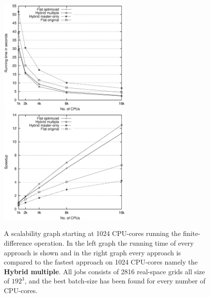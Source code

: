 \documentclass[preprint,3p,times,twocolumn]{elsarticle}
\begin{document}
\begin{figure}
\centerline{
\mbox{\includegraphics[width=250px]{gfx/fidi_scaleruntime}}
\mbox{\includegraphics[width=250px]{gfx/fidi_scale}}
} 
 \caption{A scalability graph starting at 1024 CPU-cores running the finite-difference operation. In the left graph the running time of every approach is shown and in the right graph every approach is compared to the fastest approach on 1024 CPU-cores namely the \textbf{Hybrid multiple}. All jobs consists of 2816 real-space grids all size of $192^3$, and the best batch-size has been found for every number of CPU-cores.}
 \label{fig:scale}
\end{figure}
\end{document}
